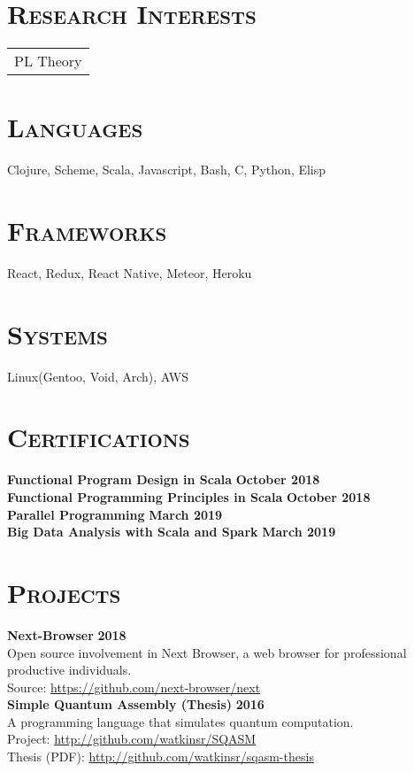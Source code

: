 \documentclass[line, margin, 10pt]{res}
\begin{document}
\begin{resume}
\section{\textsc{Research Interests}}
\begin{tabular}[t]{@{} p{6.0 in}  @{}}
  PL Theory\\
\end{tabular}

\section{\textsc{Languages}}
Clojure, Scheme, Scala, Javascript, Bash, C, Python, Elisp

\section{\textsc{Frameworks}}
React, Redux, React Native, Meteor, Heroku

\section{\textsc {Systems}}
Linux(Gentoo, Void, Arch), AWS \\

\section{\textsc{Certifications}}
{\bf Functional Program Design in Scala} {\bf \hfill October 2018}\\
{\bf Functional Programming Principles in Scala} {\bf \hfill October 2018}\\
{\bf Parallel Programming} {\bf \hfill March 2019}\\
{\bf Big Data Analysis with Scala and Spark} {\bf \hfill March 2019}\\

\newpage
\section{\textsc{Projects}}

{\bf Next-Browser} {\bf \hfill 2018}\\
Open source involvement in Next Browser, a web browser for professional productive individuals.\\
Source: \url{https://github.com/next-browser/next}\\

{\bf Simple Quantum Assembly (Thesis)} {\bf \hfill 2016}\\
A programming language that simulates quantum computation.\\
Project: \url{http://github.com/watkinsr/SQASM}\\
Thesis (PDF): \url{http://github.com/watkinsr/sqasm-thesis}\\


\end{resume}
\end{document}
